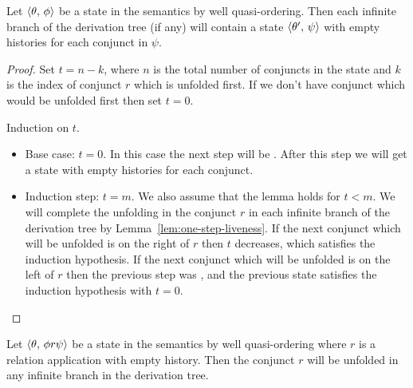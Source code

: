 \begin{lemma}
  \label{lem:histories-devastation}
  Let $\langle \theta,\, \phi \rangle$ be a state in the semantics by well quasi-ordering. Then each infinite branch of the derivation tree (if any)
  will contain a state $\langle \theta^\prime,\, \psi \rangle$ with empty histories for each conjunct in $\psi$.
\end{lemma}

\begin{proof}
  Set $t = n - k$, where $n$ is the total number of conjuncts in the state and $k$ is the index of conjunct $r$ which is unfolded first.
  If we don't have conjunct which would be unfolded first then set $t = 0$.

  Induction on $t$.
          
 \begin{itemize}
    \item Base case: $t = 0$.      
          In this case the next step will be . After this step we will get a state with empty histories for each conjunct.
    \item Induction step: $t = m$. We also assume that the lemma holds for $t < m$.
          We will complete the unfolding in the conjunct $r$ in each infinite branch of the derivation tree by Lemma~\ref{lem:one-step-liveness}.
          If the next conjunct which will be unfolded is on the right of $r$ then $t$ decreases, which satisfies the induction hypothesis. If the next
          conjunct which will be unfolded is on the left of $r$ then the previous step was , and the previous state satisfies the
          induction hypothesis with $t = 0$.
 \end{itemize}
\end{proof}

\begin{lemma}
  \label{lem:empty-stories-liveness}
  Let $\langle \theta,\, \phi r \psi \rangle$ be a state in the semantics by well quasi-ordering where $r$ is a relation application
  with empty history. Then the conjunct $r$ will be unfolded in any infinite branch in the derivation tree.
\end{lemma}

